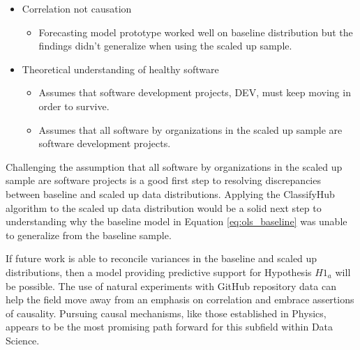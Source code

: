 \documentclass{article}
\begin{document}
\begin{itemize}
\item Correlation not causation
  \begin{itemize}
  \item Forecasting model prototype worked well on baseline distribution
    but the findings didn’t generalize when using the scaled up sample.
    \end{itemize}
\item Theoretical understanding of healthy software
  \begin{itemize}
  \item Assumes that software development projects, DEV, must keep
    moving in order to survive.
  \item Assumes that all software by organizations in the scaled up sample
    are software development projects.
  \end{itemize}
\end{itemize}

Challenging the assumption that all software by organizations in the scaled
up sample are software projects is a good first step to resolving
discrepancies between baseline and scaled up data distributions. Applying
the ClassifyHub \cite{soll2017classifyhub} algorithm to the scaled up
data distribution would be a solid next step to understanding why the
baseline model in Equation \ref{eq:ols_baseline} was unable to generalize
from the baseline sample.

If future work is able to reconcile variances in the baseline and scaled up
distributions, then a model providing predictive support for Hypothesis
$H1_a$ will be possible. The use of natural experiments with GitHub
repository data can help the field move away from an emphasis on correlation
and embrace assertions of causality. Pursuing causal mechanisms, like those
established in Physics, appears to be the most promising path forward for
this subfield within Data Science.



\end{document}
